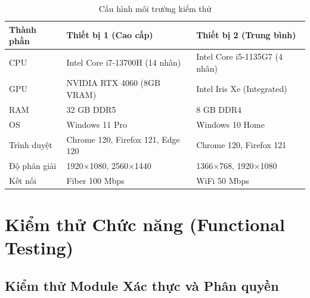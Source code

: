 \begin{table}[H]
\centering
\caption{Cấu hình môi trường kiểm thử}
\begin{tabular}{|p{}|p{}|p{}|}
\hline
\textbf{Thành phần} & \textbf{Thiết bị 1 (Cao cấp)} & \textbf{Thiết bị 2 (Trung bình)} \\
\hline
CPU & Intel Core i7-13700H (14 nhân) & Intel Core i5-1135G7 (4 nhân) \\
\hline
GPU & NVIDIA RTX 4060 (8GB VRAM) & Intel Iris Xe (Integrated) \\
\hline
RAM & 32 GB DDR5 & 8 GB DDR4 \\
\hline
OS & Windows 11 Pro & Windows 10 Home \\
\hline
Trình duyệt & Chrome 120, Firefox 121, Edge 120 & Chrome 120, Firefox 121 \\
\hline
Độ phân giải & 1920×1080, 2560×1440 & 1366×768, 1920×1080 \\
\hline
Kết nối & Fiber 100 Mbps & WiFi 50 Mbps \\
\hline
\end{tabular}
\end{table}

\section{Kiểm thử Chức năng (Functional Testing)}

\subsection{Kiểm thử Module Xác thực và Phân quyền}

